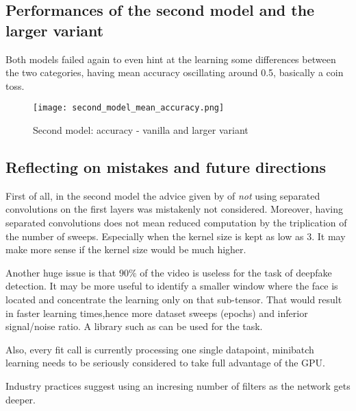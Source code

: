 \subsection{Performances of the second model and the larger variant}

Both models failed again to even hint at the learning some differences between the
two categories, having mean accuracy oscillating around 0.5, basically a coin toss.

\begin{figure}[h]
\caption{Second model: accuracy - vanilla and larger variant}
\centering
\texttt{[image: second\_model\_mean\_accuracy.png]}
\end{figure}

\subsection{Reflecting on mistakes and future directions}

First of all, in the second model the advice given by \cite{Burlacu}
of \emph{not} using separated convolutions on the first layers was mistakenly not
considered. Moreover, having separated convolutions does not mean reduced computation
by the triplication of the number of sweeps. Especially when the kernel size
is kept as low as 3. It may make more sense if the kernel size would be much higher.

Another huge issue is that $90\%$ of the video is useless for the task of deepfake detection.
It may be more useful to identify a smaller window where the face is located
and concentrate the learning only on that sub-tensor. That would result in faster
learning times,hence more dataset sweeps (epochs) and inferior signal/noise ratio. A library such as \cite{pyface} can be used for the task.

Also, every fit call is currently processing one single datapoint, minibatch learning
needs to be seriously considered to take full advantage of the GPU.

Industry practices suggest using an incresing number of filters as the network gets deeper.
